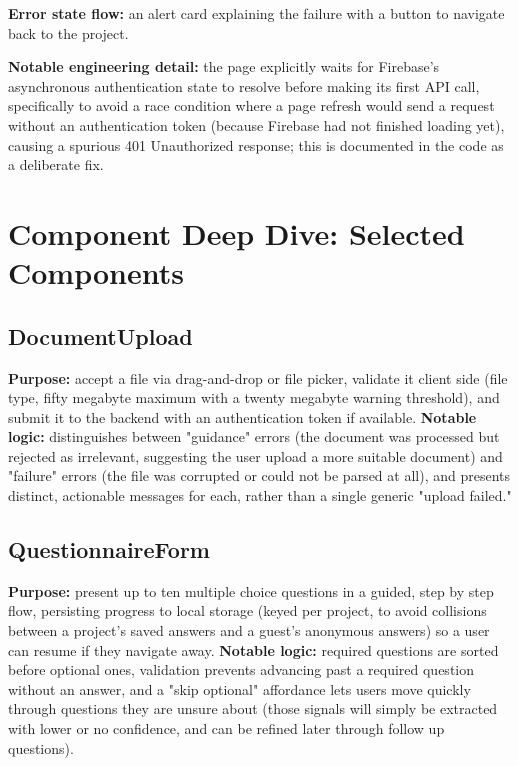 \documentclass[11pt,a4paper]{report}
\begin{document}
\textbf{Error state flow:} an alert card explaining the failure with a button to navigate back to the project.

\textbf{Notable engineering detail:} the page explicitly waits for Firebase's asynchronous authentication state to resolve before making its first API call, specifically to avoid a race condition where a page refresh would send a request without an authentication token (because Firebase had not finished loading yet), causing a spurious 401 Unauthorized response; this is documented in the code as a deliberate fix.

\section{Component Deep Dive: Selected Components}

\subsection{DocumentUpload}
\textbf{Purpose:} accept a file via drag-and-drop or file picker, validate it client side (file type, fifty megabyte maximum with a twenty megabyte warning threshold), and submit it to the backend with an authentication token if available.
\textbf{Notable logic:} distinguishes between "guidance" errors (the document was processed but rejected as irrelevant, suggesting the user upload a more suitable document) and "failure" errors (the file was corrupted or could not be parsed at all), and presents distinct, actionable messages for each, rather than a single generic "upload failed."

\subsection{QuestionnaireForm}
\textbf{Purpose:} present up to ten multiple choice questions in a guided, step by step flow, persisting progress to local storage (keyed per project, to avoid collisions between a project's saved answers and a guest's anonymous answers) so a user can resume if they navigate away.
\textbf{Notable logic:} required questions are sorted before optional ones, validation prevents advancing past a required question without an answer, and a "skip optional" affordance lets users move quickly through questions they are unsure about (those signals will simply be extracted with lower or no confidence, and can be refined later through follow up questions).
\end{document}
